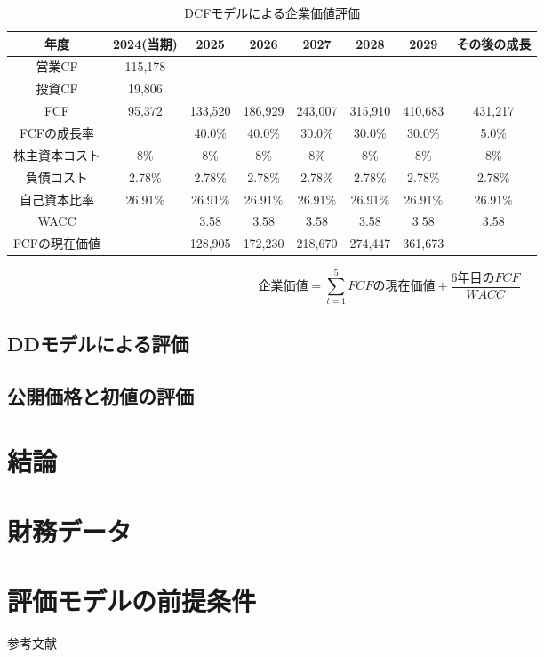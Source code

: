 \documentclass[a4paper]{ltjsarticle}
\begin{document}
\begin{table}[H]
  \begin{center}
    \caption{DCFモデルによる企業価値評価}
    \begin{tabular}{|c|c|c|c|c|c|c|c|} \hline
      年度 & 2024(当期) & 2025 & 2026 & 2027 & 2028 & 2029 & その後の成長 \\ \hline
      営業CF & 115,178 &  &  &  &  &  & \\ \hline
      投資CF & 19,806 &  &  &  &  &  & \\ \hline
      FCF & 95,372 & 133,520 & 186,929 & 243,007 & 315,910 & 410,683 & 431,217 \\ \hline
      FCFの成長率 &  & 40.0\% & 40.0\% & 30.0\% & 30.0\% & 30.0\% & 5.0\% \\ \hline
      株主資本コスト & 8${\%}$ & 8${\%}$ & 8${\%}$ & 8${\%}$ & 8${\%}$ & 8\% & 8\% \\ \hline
      負債コスト & 2.78\% & 2.78\% & 2.78\% & 2.78\% & 2.78\% & 2.78\% & 2.78\% \\ \hline
      自己資本比率 & 26.91\% & 26.91\% & 26.91\% & 26.91\% & 26.91\% & 26.91\% & 26.91\% \\ \hline
      WACC &  & 3.58 & 3.58 & 3.58 & 3.58 & 3.58 & 3.58 \\ \hline
      FCFの現在価値 &  & 128,905 & 172,230 & 218,670 & 274,447 & 361,673 & \\ \hline
    \end{tabular}
  \end{center}
\end{table}

\[
企業価値 = \sum_{t=1}^{5} {FCFの現在価値} + \frac{6年目のFCF}{WACC}
\]

\subsection{DDモデルによる評価}
\subsection{公開価格と初値の評価}

\section{結論}

\appendix
\section{財務データ}

\section{評価モデルの前提条件}

\begin{thebibliography}{9}
 参考文献
\end{thebibliography}
\end{document}
